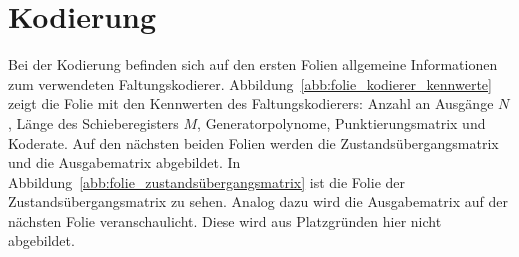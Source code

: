 \section{Kodierung}
\label{kapitel:visualisierung_kodierung}
Bei der Kodierung befinden sich auf den ersten Folien allgemeine Informationen zum verwendeten Faltungskodierer. Abbildung~\ref{abb:folie_kodierer_kennwerte} zeigt die Folie mit den Kennwerten des Faltungskodierers: Anzahl an Ausgänge $N$, Länge des Schieberegisters $M$, Generatorpolynome, Punktierungsmatrix und Koderate. Auf den nächsten beiden Folien werden die Zustandsübergangsmatrix und die Ausgabematrix abgebildet. In Abbildung~\ref{abb:folie_zustandsübergangsmatrix} ist die Folie der Zustandsübergangsmatrix zu sehen. Analog dazu wird die Ausgabematrix auf der nächsten Folie veranschaulicht. Diese wird aus Platzgründen hier nicht abgebildet.
